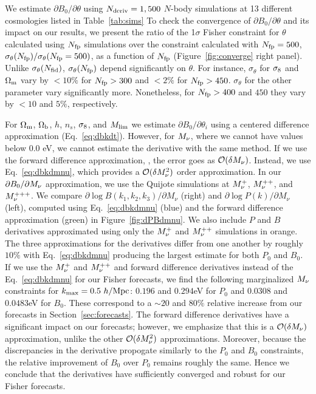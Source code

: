 We estimate $\partial B_0/\partial \theta$ using $N_{\rm deriv} = 1,500$ 
$N$-body simulations at 13 different cosmologies listed in Table~\ref{tab:sims} 
To check the convergence of $\partial B_0/\partial \theta$ and its impact on our 
results, we present the ratio of the 1$\sigma$ Fisher constraint for $\theta$ calculated 
using $N_{\rm fp}$ simulations over the constraint calculated with $N_{\rm fp} = 500$, 
$\sigma_\theta(N_{\rm fp})/\sigma_\theta(N_{\rm fp} = 500)$, as a function of 
$N_{\rm fp}$ (Figure~\ref{fig:converge} right panel). Unlike $\sigma_\theta(N_{\rm fid})$, 
$\sigma_\theta(N_{\rm fp})$ depend significantly on $\theta$. For instance, 
$\sigma_\theta$ for $\sigma_8$ and $\Omega_{\rm m}$ vary by $< 10\%$ for $N_{\rm fp} > 300$ 
and $< 2\%$ for $N_{\rm fp} > 450$. $\sigma_\theta$ for the other parameter 
vary significantly more. Nonetheless, for $N_{\rm fp} > 400$ and $450$ they vary by 
$< 10$ and $5\%$, respectively. 

For $\Omega_{\rm m}$, $\Omega_{\rm b}$, $h$, $n_s$, $\sigma_8$, and $M_{\rm lim}$ we estimate 
$\partial B_0/\partial \theta_i$ using a centered difference approximation 
(Eq.~\ref{eq:dbkdt}). However, for $M_\nu$, where we cannot have values below 
0.0 eV, we cannot estimate the derivative with the same method. If we use the 
forward difference approximation, 
\beq 
{} \approx {}, 
\eeq
the error goes as $\mathcal{O}(\delta M_\nu)$. Instead, we use Eq.~\ref{eq:dbkdmnu},
which provides a $\mathcal{O}(\delta M_\nu^2)$ order approximation. In our 
$\partial B_0/\partial M_\nu$ approximation, we use the Quijote simulations at 
$M_\nu^{+}$, $M_\nu^{++}$, and $M_\nu^{+++}$. We compare 
$\partial \log B(k_1, k_2, k_3)/\partial M_\nu$ (right) and 
$\partial \log P(k)/\partial M_\nu$ (left), computed using Eq.~\ref{eq:dbkdmnu} (blue) 
and the forward difference approximation (green) in Figure~\ref{fig:dPBdmnu}.
We also include $P$ and $B$ derivatives approximated using only the $M_\nu^{+}$ and 
$M_\nu^{++}$ simulations in orange.  The three approximations for the 
derivatives differ from one another by roughly $10\%$ with Eq.~\ref{eq:dbkdmnu} producing 
the largest estimate for both $P_0$ and $B_0$. If we use the $M_\nu^{+}$ and $M_\nu^{++}$ 
and forward difference derivatives instead of the Eq.~\ref{eq:dbkdmnu} for our Fisher 
forecasts, we find the following marginalized $M_\nu$ constraints for $k_{\rm max} = 0.5~h/{\rm Mpc}$: 
$0.196$ and $0.294$eV for $P_0$ and  $0.0308$ and $0.0483$eV for $B_0$. These correspond 
to a $\sim20$ and $80\%$ relative increase from our forecasts in Section~\ref{sec:forecasts}. 
The forward difference derivatives have a significant impact on our forecasts; however, 
we emphasize that this is a 
$\mathcal{O}(\delta M_\nu)$ approximation, unlike the other $\mathcal{O}(\delta M_\nu^2)$ 
approximations. Moreover, because the discrepancies in the derivative propogate similarly
to the $P_0$ and $B_0$ constraints, the relative improvement of $B_0$ over $P_0$ remains
roughly the same. Hence we conclude that the derivatives have sufficiently converged and 
robust for our Fisher forecasts.

